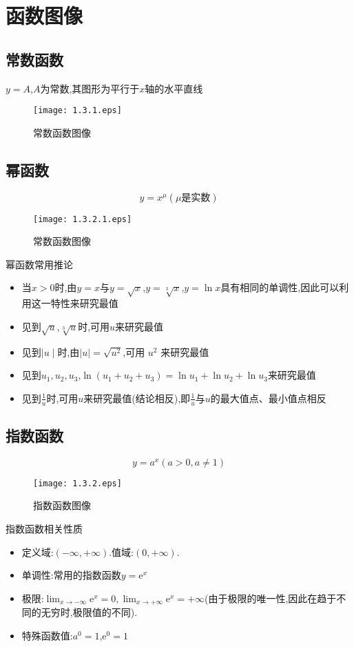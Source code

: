 \documentclass[12pt, a4paper, oneside, UTF8]{ctexbook}  %
\begin{document}
\section{函数图像}
\subsection{常数函数}
$y=A$,$A$为常数,其图形为平行于$x$轴的水平直线
\begin{figure}[H]
    \centering \texttt{[image: 1.3.1.eps]} \caption{常数函数图像}
\end{figure}
\subsection{幂函数}
$$
    y=x^{\mu}(\mu \text{是实数})
$$
\begin{figure}[H]
    \centering \texttt{[image: 1.3.2.1.eps]} \caption{常数函数图像}
\end{figure}
\begin{corollary}{幂函数常用推论}{}
    \begin{itemize}
        \item 当$x>0$时,由$y=x$与$y=\sqrt{x}$,$y=\sqrt[3]{x}$,$y=\ln x$具有相同的单调性,因此可以利用这一特性来研究最值
        \item 见到$\sqrt{u}$,$\sqrt[3]{u}$时,可用$u$来研究最值
        \item 见到$\mid u\mid$时,由$\mid u\mid=\sqrt{u^2}$,可用 $u^2$ 来研究最值
        \item 见到$u_1,u_2,u_3$,$\ln (u_1+u_2+u_3)=\ln u_{1}+\ln u_{2}+\ln u_{3}$来研究最值
        \item 见到$\frac{1}{u}$时,可用$u$来研究最值(结论相反),即$\frac{1}{u}$与$u$的最大值点、最小值点相反
    \end{itemize}
\end{corollary}
\subsection{指数函数}
$$
    y=a^x (a>0,a \neq 1)
$$
\begin{figure}[H]
    \centering \texttt{[image: 1.3.2.eps]} \caption{指数函数图像}
\end{figure}

\begin{criterion}{指数函数相关性质}{}
    \begin{itemize}
        \item 定义域:$(-\infty,+\infty)$.值域:$(0,+\infty)$.
        \item 单调性:常用的指数函数$y=\mathrm{e}^x$
        \item 极限:$\lim_{x\to-\infty}\mathrm{e}^x=0,\lim_{x\to+\infty}\mathrm{e}^x=+\infty$(由于极限的唯一性,因此在趋于不同的无穷时,极限值的不同).
        \item 特殊函数值:$a^0=1$,$\mathrm{e}^0=1$
    \end{itemize}
\end{criterion}
\end{document}
